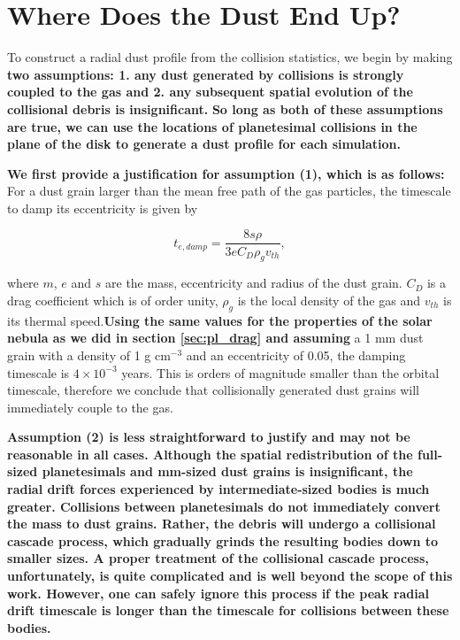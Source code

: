 \documentclass[fleqn,usenatbib]{mnras}
\begin{document}
\section{Where Does the Dust End Up?}\label{sec:dust}

To construct a radial dust profile from the collision statistics, we begin by making \textbf{two assumptions: 1. any dust generated by collisions is strongly coupled to the gas and 2. any subsequent spatial evolution of the collisional debris is insignificant.} \textbf{So long as both of these assumptions are true, we can use the locations of planetesimal collisions in the plane of the disk to generate a dust profile for each simulation.}

\textbf{We first provide a justification for assumption (1), which is as follows:} For a dust grain larger than the mean free path of the gas particles, the timescale to damp its eccentricity is given by \citep{1976PThPh..56.1756A}

\begin{equation}\label{eq:t_edamp}
    t_{e, damp} = \frac{8 s \rho}{3 e C_{D} \rho_{g} v_{th}},
\end{equation}

\noindent where $m$, $e$ and $s$ are the mass, eccentricity and radius of the dust grain. $C_{D}$ is a drag coefficient which is of order unity, $
\rho_{g}$ is the local density of the gas and $v_{th}$ is its thermal speed.\textbf{Using the same values for the properties of the solar nebula as we did in section \ref{sec:pl_drag} and assuming} a 1 mm dust grain with a 
density of 1 g cm$^{-3}$ and an eccentricity of 0.05, the damping timescale is $4 \times 10^{-3}$ years. This is orders of magnitude smaller than the 
orbital timescale, therefore we conclude that collisionally generated dust grains will immediately couple to the gas.

\textbf{Assumption (2) is less straightforward to justify and may not be reasonable in all cases. Although the spatial redistribution of the full-sized planetesimals and mm-sized dust grains is insignificant, the radial drift forces experienced by intermediate-sized bodies is much greater. Collisions between planetesimals do not immediately convert the mass to dust grains. Rather, the debris will undergo a collisional cascade process, which gradually grinds the resulting bodies down to smaller sizes. A proper treatment of the collisional cascade process, unfortunately, is quite complicated and is well beyond the scope of this work. However, one can safely ignore this process if the peak radial drift timescale is longer than the timescale for collisions between these bodies.}
\end{document}
